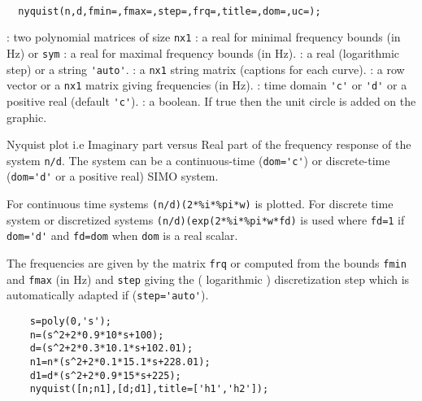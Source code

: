 \begin{mandesc}
  \\
\end{mandesc}
\begin{calling_sequence}
\begin{verbatim}
  nyquist(n,d,fmin=,fmax=,step=,frq=,title=,dom=,uc=);
\end{verbatim}
\end{calling_sequence}
\begin{parameters}
  \begin{varlist}
    : two polynomial matrices of size \verb!nx1!
    : a real for minimal frequency bounds (in Hz) or \verb!sym!
    : a real for maximal frequency bounds (in Hz).
    : a real (logarithmic step) or a string \verb!'auto'!.
    : a \verb!nx1! string matrix (captions for each curve).
    : a row vector or a \verb!nx1! matrix giving frequencies (in Hz).
    : time domain \verb!'c'! or \verb!'d'! or a positive real (default \verb!'c'!).
    : a boolean. If true then the unit circle is added on the graphic.
  \end{varlist}
\end{parameters}

\begin{mandescription}
  Nyquist plot i.e Imaginary part versus Real part of the frequency
  response of the system \verb!n/d!. The system can be a continuous-time (\verb!dom='c'!) or
  discrete-time (\verb!dom='d'! or a positive real) SIMO system.

  For continuous time systems \verb!(n/d)(2*%i*%pi*w)! is plotted.
  For discrete time system or discretized systems \verb!(n/d)(exp(2*%i*%pi*w*fd)!
  is used where \verb!fd=1! if \verb!dom='d'! and \verb!fd=dom! when \verb!dom! is a real scalar.

  The frequencies are given by the matrix \verb!frq! or computed from
  the bounds \verb!fmin! and \verb!fmax! (in Hz) and \verb!step! giving
  the ( logarithmic ) discretization step which is automatically adapted if
  (\verb!step='auto'!).
\end{mandescription}

\begin{examples}
  \begin{Verbatim}
    s=poly(0,'s');
    n=(s^2+2*0.9*10*s+100);
    d=(s^2+2*0.3*10.1*s+102.01);
    n1=n*(s^2+2*0.1*15.1*s+228.01);
    d1=d*(s^2+2*0.9*15*s+225);
    nyquist([n;n1],[d;d1],title=['h1','h2']);
  \end{Verbatim}
\end{examples}

\begin{manseealso}
\end{manseealso}
